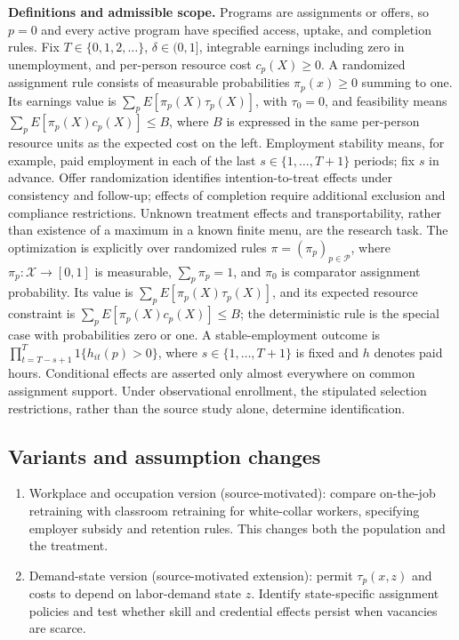 \documentclass[11pt,a4paper]{article}
\begin{document}
\textbf{Definitions and admissible scope.} Programs are assignments or offers, so \(p=0\) and every active program have specified access, uptake, and completion rules. Fix \(T\in\{0,1,2,\ldots\}\), \(\delta\in(0,1]\), integrable earnings including zero in unemployment, and per-person resource cost \(c_p(X)\ge0\). A randomized assignment rule consists of measurable probabilities \(\pi_p(x)\ge0\) summing to one. Its earnings value is \(\sum_pE[\pi_p(X)\tau_p(X)]\), with \(\tau_0=0\), and feasibility means \(\sum_pE[\pi_p(X)c_p(X)]\le B\), where \(B\) is expressed in the same per-person resource units as the expected cost on the left. Employment stability means, for example, paid employment in each of the last \(s\in\{1,\ldots,T+1\}\) periods; fix \(s\) in advance. Offer randomization identifies intention-to-treat effects under consistency and follow-up; effects of completion require additional exclusion and compliance restrictions. Unknown treatment effects and transportability, rather than existence of a maximum in a known finite menu, are the research task. The optimization is explicitly over randomized rules \(\pi=(\pi_p)_{p\in\mathcal P}\), where \(\pi_p:\mathcal X\to[0,1]\) is measurable, \(\sum_p\pi_p=1\), and \(\pi_0\) is comparator assignment probability. Its value is \(\sum_pE[\pi_p(X)\tau_p(X)]\), and its expected resource constraint is \(\sum_pE[\pi_p(X)c_p(X)]\le B\); the deterministic rule is the special case with probabilities zero or one. A stable-employment outcome is \(\prod_{t=T-s+1}^T1\{h_{it}(p)>0\}\), where \(s\in\{1,\ldots,T+1\}\) is fixed and \(h\) denotes paid hours. Conditional effects are asserted only almost everywhere on common assignment support. Under observational enrollment, the stipulated selection restrictions, rather than the source study alone, determine identification.
\subsection*{Variants and assumption changes}
\begin{enumerate}
\item Workplace and occupation version (source-motivated): compare on-the-job retraining with classroom retraining for white-collar workers, specifying employer subsidy and retention rules. This changes both the population and the treatment.
\item Demand-state version (source-motivated extension): permit \(\tau_p(x,z)\) and costs to depend on labor-demand state \(z\). Identify state-specific assignment policies and test whether skill and credential effects persist when vacancies are scarce.
\end{enumerate}
\end{document}

